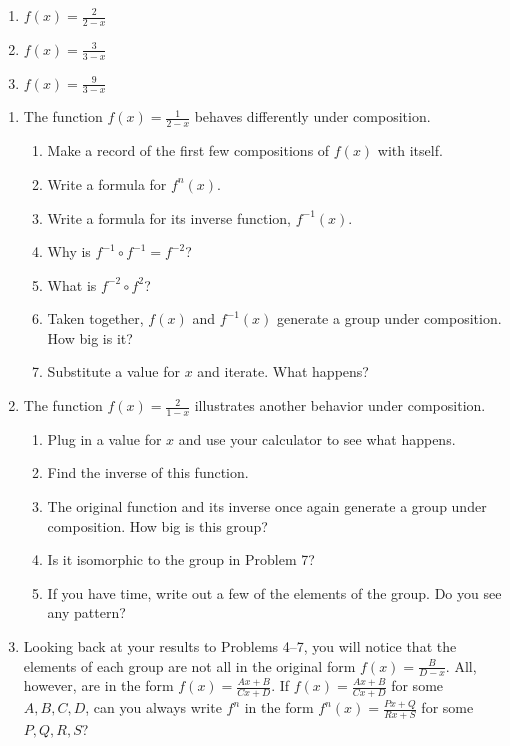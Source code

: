 \documentclass[../gatm.tex]{subfiles}
\begin{document}
\begin{multicols}{3}
\begin{enumerate}
\setcounter{enumi}{\value{problem_i}}
\item \label{prob:compose_start}$f(x)=\frac{2}{2-x}$
\item $f(x)=\frac{3}{3-x}$
\item \label{prob:compose_end}$f(x)=\frac{9}{3-x}$
\setcounter{problem_i}{\value{enumi}}
\end{enumerate}
\end{multicols}
\begin{enumerate}
\setcounter{enumi}{\value{problem_i}}
\item The function $f(x)=\frac{1}{2-x}$ behaves differently under composition.
\begin{enumerate}
\item Make a record of the first few compositions of $f(x)$ with itself.
\item Write a formula for $f^n(x)$.
\item Write a formula for its inverse function, $f^{-1}(x)$.
\item Why is $f^{-1}\circ f^{-1}=f^{-2}$?
\item What is $f^{-2}\circ f^2$?
\item Taken together, $f(x)$ and $f^{-1}(x)$ generate a group under composition. How big is it?
\item Substitute a value for $x$ and iterate. What happens?
\end{enumerate}
\item The function $f(x)=\frac{2}{1-x}$ illustrates another behavior under composition.
\begin{enumerate}
\item Plug in a value for $x$ and use your calculator to see what happens.
\item Find the inverse of this function.
\item The original function and its inverse once again generate a group under composition. How big is this group?
\item Is it isomorphic to the group in Problem 7?
\item If you have time, write out a few of the elements of the group. Do you see any pattern?
\end{enumerate}
\item Looking back at your results to Problems 4--7, you will notice that the elements of each group are not all in the original form $f(x)=\frac{B}{D-x}$. All, however, are in the form $f(x)=\frac{Ax+B}{Cx+D}$. If $f(x)=\frac{Ax+B}{Cx+D}$ for some $A,B,C,D$, can you always write $f^n$ in the form $f^n(x)=\frac{Px+Q}{Rx+S}$ for some $P,Q,R,S$?
\setcounter{problem_i}{\value{enumi}}
\end{enumerate}
\end{document}
